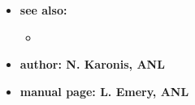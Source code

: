 \begin{itemize}
\item {\bf see also:}
    \begin{itemize}
%
%
    \item {}
    \end{itemize}
%
%
\item {\bf author: N. Karonis, ANL} 
\item {\bf manual page: L. Emery, ANL} 
\end{itemize}
